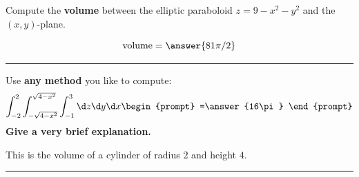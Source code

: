 \documentclass{ximera}
\begin{document}
\begin{problem}
  Compute the \textbf{volume} between the elliptic paraboloid $z = 9-x^2-y^2$
  and the $(x,y)$-plane.
  \begin{prompt}
    \[
    \text{volume} = \answer{81\pi/2}
    \]
  \end{prompt}
\end{problem}

\vfill
\hrule
\begin{problem}
  Use \textbf{any method} you like to compute:
  \[
  \int_{-2}^{2} \int_{-\sqrt{4-x^2}}^{\sqrt{4-x^2}}\int_{-1}^3 \d z\d y \d x
  \begin{prompt}
  =\answer{16\pi}  
  \end{prompt}
  \]
  \textbf{Give a very brief explanation.}
  \begin{feedback}[correct]
    This is the volume of a cylinder of radius $2$ and height $4$.
  \end{feedback}
  \vfill
\end{problem}
\hrule
\end{document}
